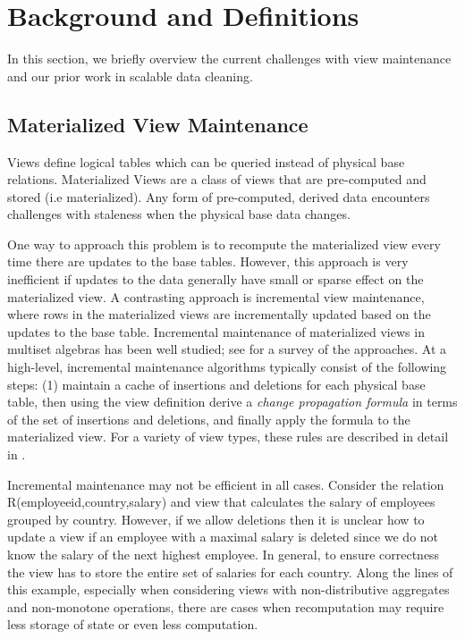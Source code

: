 \section{Background and Definitions}\label{sec-background}

In this section, we briefly overview the current challenges with view maintenance and
our prior work in scalable data cleaning.

\subsection{Materialized View Maintenance}\label{subsec-inc}
Views define logical tables which can be queried instead of physical base relations.
Materialized Views are a class of views that are pre-computed and stored (i.e materialized).
Any form of pre-computed, derived data encounters challenges with staleness when the physical base data changes.

One way to approach this problem is to recompute the materialized view every time there are updates to the base tables.
However, this approach is very inefficient if updates to the data generally have small or sparse effect on the materialized view. 
A contrasting approach is incremental view maintenance, where rows in the materialized views are incrementally updated based on the updates to the base table.
Incremental maintenance of materialized views in multiset algebras has been well studied; see \cite{chirkova2011materialized} for a survey of the approaches. 
At a high-level, incremental maintenance algorithms typically consist of the following steps: (1) maintain a cache of insertions and deletions for each physical base table, then using the view definition derive a \emph{change propagation formula} in terms of the set of insertions and deletions, and finally apply the formula to the materialized view.
For a variety of view types, these rules are described in detail in \cite{DBLP:journals/vldb/KochAKNNLS14, DBLP:conf/pods/Koch10}.

Incremental maintenance may not be efficient in all cases.
Consider the relation R(employeeid,country,salary) and view that calculates the \maxfunc salary of employees grouped by country. 
However, if we allow deletions then it is unclear how to update a view if an employee with a maximal salary is deleted since we do not know the salary of the next highest employee. 
In general, to ensure correctness the view has to store the entire set of salaries for each country.
Along the lines of this example, especially when considering views with non-distributive aggregates and non-monotone operations, there are 
cases when recomputation may require less storage of state or even less computation.

